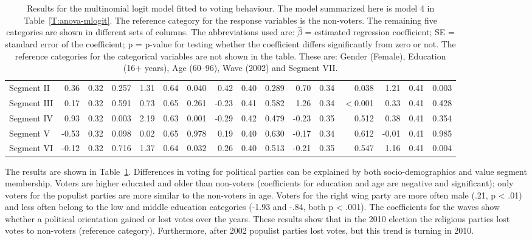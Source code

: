 \documentclass[12pt,letter]{article}\usepackage[]{graphicx}\usepackage[]{xcolor}
\begin{document}
\begin{table}
\begin{tabular}{lrrrrrrrrrrrrrrr}
  Segment II & 0.36 & 0.32 & 0.257 & 1.31 & 0.64 & 0.040 & 0.42 & 0.40 & 0.289 & 0.70 & 0.34 & 0.038 & 1.21 & 0.41 & 0.003 \\ 
  Segment III & 0.17 & 0.32 & 0.591 & 0.73 & 0.65 & 0.261 & -0.23 & 0.41 & 0.582 & 1.26 & 0.34 & $<$0.001 & 0.33 & 0.41 & 0.428 \\ 
  Segment IV & 0.93 & 0.32 & 0.003 & 2.19 & 0.63 & 0.001 & -0.29 & 0.42 & 0.479 & -0.23 & 0.35 & 0.512 & 0.38 & 0.41 & 0.354 \\ 
  Segment V & -0.53 & 0.32 & 0.098 & 0.02 & 0.65 & 0.978 & 0.19 & 0.40 & 0.630 & -0.17 & 0.34 & 0.612 & -0.01 & 0.41 & 0.985 \\ 
  Segment VI & -0.12 & 0.32 & 0.716 & 1.37 & 0.64 & 0.032 & 0.26 & 0.40 & 0.513 & -0.21 & 0.35 & 0.547 & 1.16 & 0.41 & 0.004 \\ 
   \bottomrule
\end{tabular}
\endgroup
\caption{Results for the multinomial logit model fitted to voting behaviour. The model summarized here is model 4 in Table~\ref{T:anova-mlogit}. The reference category for the response variables is the non-voters. The remaining five categories are shown in different sets of columns. The abbreviations used are: $\hat{\beta}$ = estimated regression coefficient; SE = standard error of the coefficient; p = p-value for testing whether the coefficient differs significantly from zero or not. The reference categories for the categorical variables are not shown in the table. These are: Gender (Female), Education (16+ years), Age (60--96), Wave (2002) and Segment VII.} 
\label{T:mlogit-fit}
\end{table}


The results are shown in Table~\ref{T:mlogit-fit}. Differences in voting for political parties can be explained by both socio-demographics and value segment membership. Voters are higher educated and older than non-voters (coefficients for education and age are negative and significant); only voters for the populist parties are more similar to the non-voters in age. Voters for the right wing party are more often male (.21, p < .01) and less often belong to the low and middle education categories (-1.93 and -.84, both p < .001). The coefficients for the waves show whether a political orientation gained or lost votes over the years. These results show that in the 2010 election the religious parties lost votes to non-voters (reference category). Furthermore, after 2002 populist parties lost votes, but this trend is turning in 2010.
\end{document}
